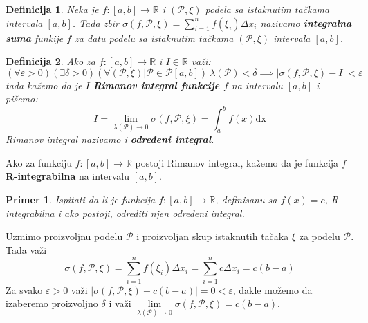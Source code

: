\documentclass{article}
\newtheorem{definicija}{Definicija}[section]
\newtheorem{prim}{Primer}[section]
\begin{document}
\begin{defbox}
    \label{definicija_2.2}
    \begin{definicija}
        Neka je $f:\left[a,b\right]\longrightarrow\mathbb{R}$ i $\left(\mathcal{P},\xi\right)$ podela sa istaknutim tačkama intervala $\left[a,b\right]$. Tada zbir
        $\displaystyle\sigma\left(f,\mathcal{P},\xi\right)=\sum_{i=1}^{n}f\left(\xi_i\right)\varDelta x_i$ nazivamo \textbf{integralna suma} funkije $f$ za datu podelu
        sa istaknutim tačkama $\left(\mathcal{P},\xi\right)$ intervala $\left[a,b\right]$.
    \end{definicija}
\end{defbox}

\begin{defbox}
    \label{definicija_2.3}
    \begin{definicija}
        Ako za $f: \left[a,b\right]\longrightarrow\mathbb{R}$ i $I\in\mathbb{R}$ važi:
        $$\left(\forall\varepsilon>0\right)\left(\exists\delta>0\right)\left(\forall\left(\mathcal{P},\xi\right)\big|\mathcal{P}\in\mathcal{P}\left[a,b\right]\right)\ \lambda\left(\mathcal{P}\right)<\delta\implies|\sigma\left(f,\mathcal{P},\xi\right)-I|<\varepsilon$$
        tada kažemo da je $I$ \textbf{Rimanov integral funkcije $f$} na intervalu $\left[a,b\right]$ i pišemo:
        $$I=\lim\limits_{\lambda\left(\mathcal{P}\right)\rightarrow 0}\sigma\left(f,\mathcal{P},\xi\right)=\int_{a}^{b}f\left(x\right)\text{dx}$$
        Rimanov integral nazivamo i \textbf{određeni integral}.
    \end{definicija}
\end{defbox}

Ako za funkciju $f:\left[a,b\right]\longrightarrow\mathbb{R}$ postoji Rimanov integral, kažemo da je funkcija $f$ \textbf{R-integrabilna} na intervalu $\left[a,b\right]$.

\begin{primbox}
    \label{primer_2.1}
    \begin{prim}
        Ispitati da li je funkcija $f: \left[a,b\right]\longrightarrow\mathbb{R}$, definisanu sa $f\left(x\right)=c$, R-integrabilna i ako postoji, odrediti njen određeni integral.
    \end{prim}
    Uzmimo proizvoljnu podelu $\mathcal{P}$ i proizvoljan skup istaknutih tačaka $\xi$ za podelu $\mathcal{P}$. Tada važi
    \begin{equation}
        \label{primer_2.1:eq1}
        \sigma\left(f,\mathcal{P},\xi\right)=\sum_{i=1}^{n} f\left(\xi_i\right)\Delta x_i=\sum_{i=1}^{n} c\Delta x_i=c\left(b-a\right)
    \end{equation}
    Za svako $\varepsilon>0$ važi $\left|\sigma\left(f,\mathcal{P},\xi\right)-c(b-a)\right|=0<\varepsilon$, dakle možemo da
    izaberemo proizvoljno $\delta$ i važi
    $\lim\limits_{\lambda\left(\mathcal{P}\right)\rightarrow0} \sigma\left(f,\mathcal{P},\xi\right)=c(b-a)$.

\end{primbox}
\end{document}
